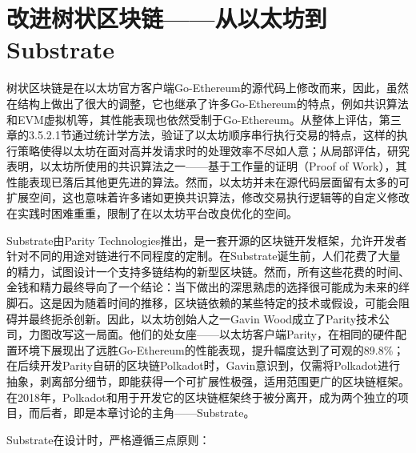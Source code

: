 %
%
%
%
%

\chapter{改进树状区块链——从以太坊到Substrate}

树状区块链是在以太坊官方客户端Go-Ethereum的源代码上修改而来，因此，虽然在结构上做出了很大的调整，它也继承了许多Go-Ethereum的特点，例如共识算法和EVM虚拟机等，其性能表现也依然受制于Go-Ethereum。从整体上评估，第三章的3.5.2.1节通过统计学方法，验证了以太坊顺序串行执行交易的特点，这样的执行策略使得以太坊在面对高并发请求时的处理效率不尽如人意；从局部评估，研究\cite{privateChainConsensus}表明，以太坊所使用的共识算法之一——基于工作量的证明（Proof of Work），其性能表现已落后其他更先进的算法。然而，以太坊并未在源代码层面留有太多的可扩展空间，这也意味着许多诸如更换共识算法，修改交易执行逻辑等的自定义修改在实践时困难重重，限制了在以太坊平台改良优化的空间。

Substrate\cite{substrateHome}由Parity Technologies推出，是一套开源的区块链开发框架，允许开发者针对不同的用途对链进行不同程度的定制。在Substrate诞生前，人们花费了大量的精力，试图设计一个支持多链结构的新型区块链。然而，所有这些花费的时间、金钱和精力最终导向了一个结论：当下做出的深思熟虑的选择很可能成为未来的绊脚石。这是因为随着时间的推移，区块链依赖的某些特定的技术或假设，可能会阻碍并最终扼杀创新\cite{substrateDoc}。因此，以太坊创始人之一Gavin Wood成立了Parity技术公司，力图改写这一局面。他们的处女座——以太坊客户端Parity，在相同的硬件配置环境下展现出了远胜Go-Ethereum的性能表现，提升幅度达到了可观的89.8\%\cite{parityVSgeth}；在后续开发Parity自研的区块链Polkadot时，Gavin意识到，仅需将Polkadot进行抽象，剥离部分细节，即能获得一个可扩展性极强，适用范围更广的区块链框架。在2018年，Polkadot和用于开发它的区块链框架终于被分离开，成为两个独立的项目，而后者，即是本章讨论的主角——Substrate。

Substrate在设计时，严格遵循三点原则：

